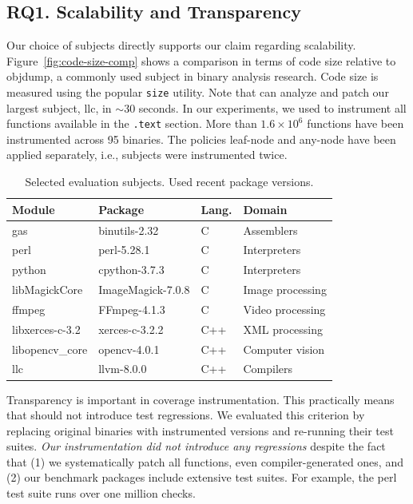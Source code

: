 \subsection*{RQ1. Scalability and Transparency}
Our choice of subjects directly supports our claim regarding scalability.
Figure~\ref{fig:code-size-comp} shows a comparison in terms of code size relative to \textsf{objdump}, a commonly used subject in binary analysis research.
Code size is measured using the popular \texttt{size} utility.
Note that {\bcov} can analyze and patch our largest subject, \textsf{llc}, in $\sim$30 seconds.
In our experiments, we used {\bcov} to instrument all functions  available in the \texttt{.text} section.
More than $1.6\times10^6$ functions have been instrumented across 95 binaries.
The policies leaf-node and any-node have been applied separately, i.e., subjects were instrumented twice.


\begin{table}[t!]
	\centering
	\setlength\tabcolsep{4pt}
	\small
	\caption{Selected evaluation subjects. Used recent package versions.}
    \label{tab:selected-benchmarks}    
	\begin{tabularx}{\columnwidth}{@{}llll@{}}
        \\
		\textbf{Module} &
		\textbf{Package} &
		\textbf{Lang.}  &
		\textbf{Domain} \\		
		\toprule
		
		\textsf{gas} & binutils-2.32 & C & Assemblers\\
		\textsf{perl} & perl-5.28.1 & C & Interpreters \\
		\textsf{python} & cpython-3.7.3 & C & Interpreters\\
		\textsf{libMagickCore} & ImageMagick-7.0.8 & C & Image processing\\
		\textsf{ffmpeg} & FFmpeg-4.1.3 & C & Video processing\\
		\textsf{libxerces-c-3.2} & xerces-c-3.2.2 & C++ & XML processing \\
		\textsf{libopencv\_core} & opencv-4.0.1 & C++ & Computer vision\\
		\textsf{llc} & llvm-8.0.0 & C++ & Compilers\\
		\bottomrule
	\end{tabularx}
\end{table}

Transparency is important in coverage instrumentation.
This practically means that {\bcov} should not introduce test regressions.
We evaluated this criterion by replacing original binaries with instrumented versions and re-running their test suites.
\textit{Our instrumentation did not introduce any regressions} despite the fact that (1) we systematically patch all functions, even compiler-generated ones, and (2)
our benchmark packages include extensive test suites.
For example, the \textsf{perl} test suite runs over one million checks.


